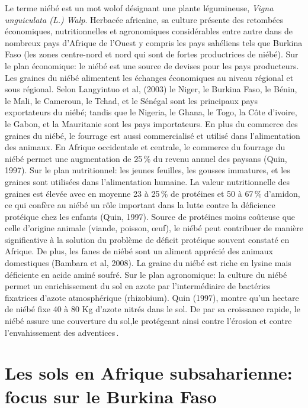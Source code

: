 \documentclass[a4paper,11pt]{article}
\begin{document}
Le terme niébé est un mot wolof désignant une plante légumineuse,
\emph{Vigna unguiculata (L.) Walp}. Herbacée africaine, sa culture
présente des retombées économiques, nutritionnelles et agronomiques
considérables entre autre dans de nombreux pays d'Afrique de l'Ouest y
compris les pays sahéliens tels que Burkina Faso (les zones
centre-nord et nord qui sont de fortes productrices de niébé). Sur le
plan économique: le niébé est une source de devises pour les pays
producteurs. Les graines du niébé alimentent les échanges économiques
au niveau régional et sous régional. Selon Langyintuo et al, (2003) le
Niger, le Burkina Faso, le Bénin, le Mali, le Cameroun, le Tchad, et
le Sénégal sont les principaux pays exportateurs du niébé; tandis que
le Nigeria, le Ghana, le Togo, la Côte d’ivoire, le Gabon, et la
Mauritanie sont les pays importateurs. En plus du commerce des graines
du niébé, le fourrage est aussi commercialisé et utilisé dans
l’alimentation des animaux. En Afrique occidentale et centrale, le
commerce du fourrage du niébé permet une augmentation de 25\,\% du
revenu annuel des paysans (Quin, 1997). Sur le plan nutritionnel: les
jeunes feuilles, les gousses immatures, et les graines sont utilisées
dans l’alimentation humaine. La valeur nutritionnelle des graines est
élevée avec en moyenne 23 à 25\,\% de protéines et 50 à 67\,\% d’amidon,
ce qui confère au niébé un rôle important dans la lutte contre la
déficience protéique chez les enfants (Quin, 1997). Source de
protéines moins coûteuse que celle d’origine animale (viande, poisson,
œuf), le niébé peut contribuer de manière significative à la solution
du problème de déficit protéique souvent constaté en Afrique. De plus,
les fanes de niébé sont un aliment apprécié des animaux domestiques
(Bambara et al, 2008). La graine du niébé est riche en lysine mais
déficiente en acide aminé soufré. Sur le plan agronomique: la culture
du niébé permet un enrichissement du sol en azote par l’intermédiaire
de bactéries fixatrices d’azote atmosphérique (rhizobium). Quin
(1997), montre qu’un hectare de niébé fixe 40 à 80 Kg d’azote nitrés
dans le sol. De par sa croissance rapide, le niébé assure une
couverture du sol,le protégeant ainsi contre l’érosion et contre
l’envahissement des adventices\,\cite{SAWADOGO_2009}.

\section{Les sols en Afrique subsaharienne: focus sur le Burkina Faso}
\end{document}
